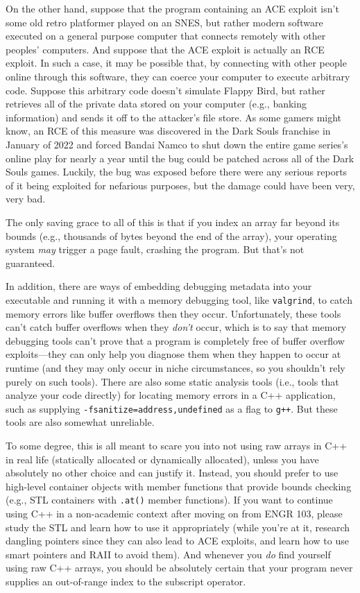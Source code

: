 \documentclass{article}
\begin{document}
On the other hand, suppose that the program containing an ACE exploit isn't some old retro platformer played on an SNES, but rather modern software executed on a general purpose computer that connects remotely with other peoples' computers. And suppose that the ACE exploit is actually an RCE exploit. In such a case, it may be possible that, by connecting with other people online through this software, they can coerce your computer to execute arbitrary code. Suppose this arbitrary code doesn't simulate Flappy Bird, but rather retrieves all of the private data stored on your computer (e.g., banking information) and sends it off to the attacker's file store. As some gamers might know, an RCE of this measure was discovered in the Dark Souls franchise in January of 2022 and forced Bandai Namco to shut down the entire game series's online play for nearly a year until the bug could be patched across all of the Dark Souls games. Luckily, the bug was exposed before there were any serious reports of it being exploited for nefarious purposes, but the damage could have been very, very bad.

The only saving grace to all of this is that if you index an array far beyond its bounds (e.g., thousands of bytes beyond the end of the array), your operating system \textit{may} trigger a page fault, crashing the program. But that's not guaranteed.

In addition, there are ways of embedding debugging metadata into your executable and running it with a memory debugging tool, like \texttt{valgrind}, to catch memory errors like buffer overflows then they occur. Unfortunately, these tools can't catch buffer overflows when they \textit{don't} occur, which is to say that memory debugging tools can't prove that a program is completely free of buffer overflow exploits---they can only help you diagnose them when they happen to occur at runtime (and they may only occur in niche circumstances, so you shouldn't rely purely on such tools). There are also some static analysis tools (i.e., tools that analyze your code directly) for locating memory errors in a C++ application, such as supplying \texttt{-fsanitize=address,undefined} as a flag to \texttt{g++}. But these tools are also somewhat unreliable.

To some degree, this is all meant to scare you into not using raw arrays in C++ in real life (statically allocated or dynamically allocated), unless you have absolutely no other choice and can justify it. Instead, you should prefer to use high-level container objects with member functions that provide bounds checking (e.g., STL containers with \texttt{.at()} member functions). If you want to continue using C++ in a non-academic context after moving on from ENGR 103, please study the STL and learn how to use it appropriately (while you're at it, research dangling pointers since they can also lead to ACE exploits, and learn how to use smart pointers and RAII to avoid them). And whenever you \textit{do} find yourself using raw C++ arrays, you should be absolutely certain that your program never supplies an out-of-range index to the subscript operator.
\end{document}
